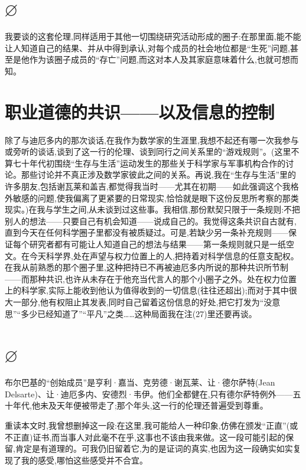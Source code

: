 \section{$\varnothing$}

我要谈的这套伦理,同样适用于其他一切围绕研究活动形成的圈子:在那里面,能不能让人知道自己的结果、并从中得到承认,对每个成员的社会地位都是“生死”问题,甚至是他作为该圈子成员的“存亡”问题,而这对本人及其家庭意味着什么,也就可想而知。

\section{职业道德的共识——以及信息的控制}

除了与迪厄多内的那次谈话,在我作为数学家的生涯里,我想不起还有哪一次我参与或旁听的谈话,谈到了这一行的伦理、谈到同行之间关系里的“游戏规则”。(这里不算七十年代初围绕“生存与生活”运动发生的那些关于科学家与军事机构合作的讨论。那些讨论并不真正涉及数学家彼此之间的关系。再说,我在“生存与生活”里的许多朋友,包括谢瓦莱和盖吉,都觉得我当时——尤其在初期——如此强调这个我格外敏感的问题,使我偏离了更紧要的日常现实,恰恰就是眼下这份反思所考察的那类现实。)在我与学生之间,从未谈到过这些事。我相信,那份默契只限于一条规则:不把别人的想法——只要自己有机会知道——说成自己的。我觉得这条共识自古就有,直到今天在任何科学圈子里都没有被质疑过。可是,若缺少另一条补充规则——保证每个研究者都有可能让人知道自己的想法与结果——第一条规则就只是一纸空文。在今天科学界,处在声望与权力位置上的人,把持着对科学信息的任意支配权。
在我从前熟悉的那个圈子里,这种把持已不再被迪厄多内所说的那种共识所节制——而那种共识,也许从未存在于他充当代言人的那个小圈子之外。处在权力位置上的科学家,实际上能收到他认为值得收到的一切信息(往往还超出);而对于其中很大一部分,他有权阻止其发表,同时自己留着这份信息的好处,把它打发为“没意思”“多少已经知道了”“平凡”之类……这种局面我在注(27)里还要再谈。

\section{$\varnothing$}

布尔巴基的“创始成员”是亨利·嘉当、克劳德·谢瓦莱、让·德尔萨特(Jean Delsarte)、让·迪厄多内、安德烈·韦伊。他们全都健在,只有德尔萨特例外——五十年代,他未及天年便被带走了;那个年头,这一行的伦理还普遍受到尊重。

重读本文时,我曾想删掉这一段:在这里,我可能给人一种印象,仿佛在颁发“正直”(或不正直)证书,而当事人对此毫不在乎,这事也不该由我来做。这一段可能引起的保留,肯定是有道理的。可我仍旧留着它,为的是证词的真实,也因为这一段确实如实复现了我的感受,哪怕这些感受并不合宜。

